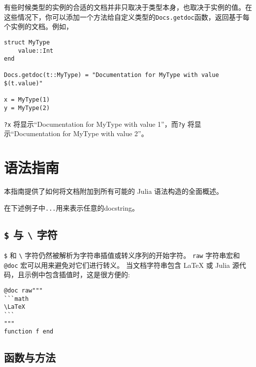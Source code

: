 有些时候类型的实例的合适的文档并非只取决于类型本身，也取决于实例的值。在这些情况下，你可以添加一个方法给自定义类型的\texttt{Docs.getdoc}函数，返回基于每个实例的文档。例如，




\begin{verbatim}
struct MyType
    value::Int
end

Docs.getdoc(t::MyType) = "Documentation for MyType with value $(t.value)"

x = MyType(1)
y = MyType(2)
\end{verbatim}



\texttt{?x} 将显示“Documentation for MyType with value 1”，而\texttt{?y} 将显示“Documentation for MyType with value 2”。



\hypertarget{12360783788480513081}{}


\section{语法指南}



本指南提供了如何将文档附加到所有可能的 Julia 语法构造的全面概述。



在下述例子中\texttt{{\textquotedbl}...{\textquotedbl}}用来表示任意的docstring。



\hypertarget{7018953543534741329}{}


\subsection{\texttt{\$} 与 \texttt{{\textbackslash}} 字符}



\texttt{\$} 和 \texttt{{\textbackslash}} 字符仍然被解析为字符串插值或转义序列的开始字符。 \texttt{raw{\textquotedbl}{\textquotedbl}} 字符串宏和 \texttt{@doc} 宏可以用来避免对它们进行转义。 当文档字符串包含 LaTeX 或 Julia 源代码，且示例中包含插值时，这是很方便的:




\begin{verbatim}
@doc raw"""
```math
\LaTeX
```
"""
function f end
\end{verbatim}



\hypertarget{198065463690830309}{}


\subsection{函数与方法}




